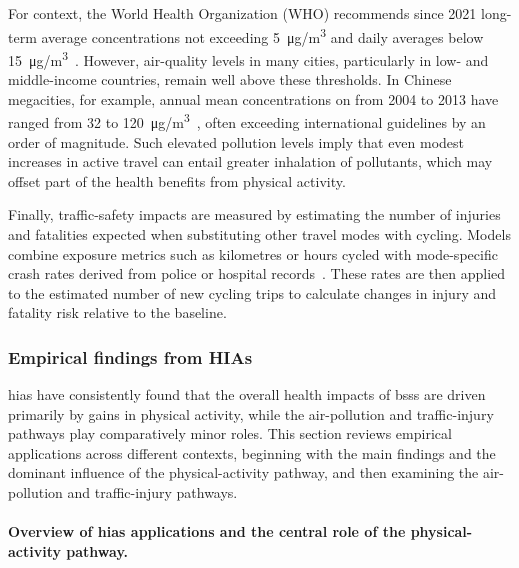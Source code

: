     For context, the World Health Organization (WHO) recommends since 2021 long-term average  concentrations not exceeding 5~\si{\micro g/m^3} and daily averages below 15~\si{\micro g/m^3}~\cite{WHO2021}. However, air-quality levels in many cities, particularly in low- and middle-income countries, remain well above these thresholds. In Chinese megacities, for example, annual mean  concentrations on from 2004 to 2013 have ranged from 32 to 120~\si{\micro g/m^3}~\cite{Ma2016}, often exceeding international guidelines by an order of magnitude. Such elevated pollution levels imply that even modest increases in active travel can entail greater inhalation of pollutants, which may offset part of the health benefits from physical activity.

    Finally, traffic-safety impacts are measured by estimating the number of injuries and fatalities expected when substituting other travel modes with cycling. Models combine exposure metrics such as kilometres or hours cycled with mode-specific crash rates derived from police or hospital records~\cite{Otero2018, Clockston2021}. These rates are then applied to the estimated number of new cycling trips to calculate changes in injury and fatality risk relative to the baseline.

    \subsubsection{Empirical findings from HIAs}

    \acp{hia} have consistently found that the overall health impacts of \acp{bss} are driven primarily by gains in physical activity, while the air-pollution and traffic-injury pathways play comparatively minor roles. This section reviews empirical applications across different contexts, beginning with the main findings and the dominant influence of the physical-activity pathway, and then examining the air-pollution and traffic-injury pathways.


    \paragraph{Overview of \acp{hia} applications and the central role of the physical-activity pathway.}

